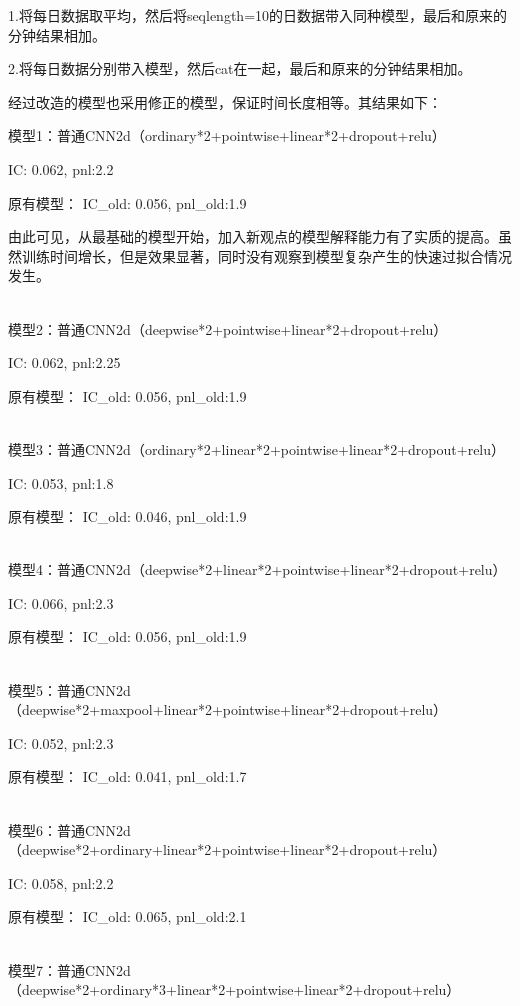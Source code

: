 \documentclass[11pt]{ctexart}
\begin{document}
1.将每日数据取平均，然后将seqlength=10的日数据带入同种模型，最后和原来的分钟结果相加。

2.将每日数据分别带入模型，然后cat在一起，最后和原来的分钟结果相加。

经过改造的模型也采用修正的模型，保证时间长度相等。其结果如下：

模型1：普通CNN2d（ordinary*2+pointwise+linear*2+dropout+relu）

{\kaishu \small IC: 0.062, pnl:2.2}

原有模型：
{\kaishu \small IC\_old: 0.056, pnl\_old:1.9}

由此可见，从最基础的模型开始，加入新观点的模型解释能力有了实质的提高。虽然训练时间增长，但是效果显著，同时没有观察到模型复杂产生的快速过拟合情况发生。

~\\
模型2：普通CNN2d（deepwise*2+pointwise+linear*2+dropout+relu）

{\kaishu \small IC: 0.062, pnl:2.25}

原有模型：
{\kaishu \small IC\_old: 0.056, pnl\_old:1.9}

~\\
模型3：普通CNN2d（ordinary*2+linear*2+pointwise+linear*2+dropout+relu）

{\kaishu \small IC: 0.053, pnl:1.8}

原有模型：
{\kaishu \small IC\_old: 0.046, pnl\_old:1.9}

~\\
模型4：普通CNN2d（deepwise*2+linear*2+pointwise+linear*2+dropout+relu）

{\kaishu \small IC: 0.066, pnl:2.3}

原有模型：
{\kaishu \small IC\_old: 0.056, pnl\_old:1.9}

~\\
模型5：普通CNN2d（deepwise*2+maxpool+linear*2+pointwise+linear*2+dropout+relu）

{\kaishu \small IC: 0.052, pnl:2.3}

原有模型：
{\kaishu \small IC\_old: 0.041, pnl\_old:1.7}

~\\
模型6：普通CNN2d（deepwise*2+ordinary+linear*2+pointwise+linear*2+dropout+relu）

{\kaishu \small IC: 0.058, pnl:2.2}

原有模型：
{\kaishu \small IC\_old: 0.065, pnl\_old:2.1}

~\\
模型7：普通CNN2d（deepwise*2+ordinary*3+linear*2+pointwise+linear*2+dropout+relu）
\end{document}

